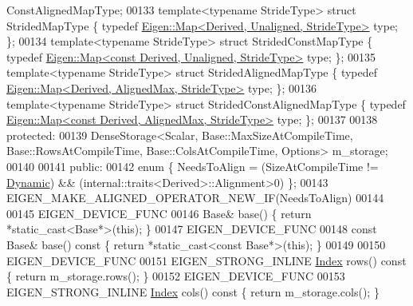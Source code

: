 \begin{DoxyCode}
      ConstAlignedMapType;
00133     \textcolor{keyword}{template}<\textcolor{keyword}{typename} Str\textcolor{keywordtype}{id}eType> \textcolor{keyword}{struct }StridedMapType \{ \textcolor{keyword}{typedef} 
      \hyperlink{group___core___module_class_eigen_1_1_map}{Eigen::Map<Derived, Unaligned, StrideType>} type; \};
00134     \textcolor{keyword}{template}<\textcolor{keyword}{typename} Str\textcolor{keywordtype}{id}eType> \textcolor{keyword}{struct }StridedConstMapType \{ \textcolor{keyword}{typedef} 
      \hyperlink{group___core___module_class_eigen_1_1_map}{Eigen::Map<const Derived, Unaligned, StrideType>} type; \};
00135     \textcolor{keyword}{template}<\textcolor{keyword}{typename} Str\textcolor{keywordtype}{id}eType> \textcolor{keyword}{struct }StridedAlignedMapType \{ \textcolor{keyword}{typedef} 
      \hyperlink{group___core___module_class_eigen_1_1_map}{Eigen::Map<Derived, AlignedMax, StrideType>} type; \};
00136     \textcolor{keyword}{template}<\textcolor{keyword}{typename} Str\textcolor{keywordtype}{id}eType> \textcolor{keyword}{struct }StridedConstAlignedMapType \{ \textcolor{keyword}{typedef} 
      \hyperlink{group___core___module_class_eigen_1_1_map}{Eigen::Map<const Derived, AlignedMax, StrideType>} type; \};
00137 
00138   \textcolor{keyword}{protected}:
00139     DenseStorage<Scalar, Base::MaxSizeAtCompileTime, Base::RowsAtCompileTime, Base::ColsAtCompileTime,
       Options> m\_storage;
00140 
00141   \textcolor{keyword}{public}:
00142     \textcolor{keyword}{enum} \{ NeedsToAlign = (SizeAtCompileTime != \hyperlink{namespace_eigen_ad81fa7195215a0ce30017dfac309f0b2}{Dynamic}) && (internal::traits<Derived>::Alignment>0)
       \};
00143     EIGEN\_MAKE\_ALIGNED\_OPERATOR\_NEW\_IF(NeedsToAlign)
00144 
00145     EIGEN\_DEVICE\_FUNC
00146     Base& base() \{ \textcolor{keywordflow}{return} *\textcolor{keyword}{static\_cast<}Base*\textcolor{keyword}{>}(\textcolor{keyword}{this}); \}
00147     EIGEN\_DEVICE\_FUNC
00148     \textcolor{keyword}{const} Base& base()\textcolor{keyword}{ const }\{ \textcolor{keywordflow}{return} *\textcolor{keyword}{static\_cast<}\textcolor{keyword}{const }Base*\textcolor{keyword}{>}(\textcolor{keyword}{this}); \}
00149 
00150     EIGEN\_DEVICE\_FUNC
00151     EIGEN\_STRONG\_INLINE \hyperlink{namespace_eigen_a62e77e0933482dafde8fe197d9a2cfde}{Index} rows()\textcolor{keyword}{ const }\{ \textcolor{keywordflow}{return} m\_storage.rows(); \}
00152     EIGEN\_DEVICE\_FUNC
00153     EIGEN\_STRONG\_INLINE \hyperlink{namespace_eigen_a62e77e0933482dafde8fe197d9a2cfde}{Index} cols()\textcolor{keyword}{ const }\{ \textcolor{keywordflow}{return} m\_storage.cols(); \}

\end{DoxyCode}
